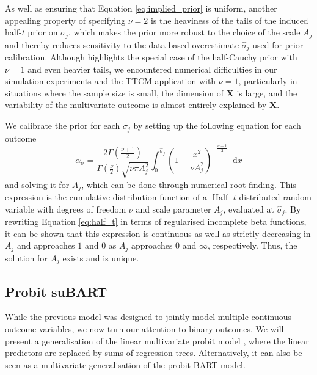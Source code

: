 \documentclass[aoas,preprint]{imsart}
\newcommand{\dd}{\mathop{}\!\mathrm{d}}
\theoremstyle{plain}
\theoremstyle{definition}
\theoremstyle{remark}
\begin{document}
As well as ensuring that Equation \eqref{eq:implied_prior} is uniform, another appealing property of specifying $\nu=2$ is the heaviness of the tails of the induced half-$t$ prior on $\sigma_j$, which makes the prior more robust to the choice of the scale $A_j$ and thereby reduces sensitivity to the data-based overestimate $\hat{\sigma}_j$ used for prior calibration. Although \citet{gelman2006prior} highlights the special case of the half-Cauchy prior with $\nu=1$ and even heavier tails, we encountered numerical difficulties in our simulation experiments and the TTCM application with $\nu=1$, particularly in situations where the sample size is small, the dimension of $\mathbf{X}$ is large, and the variability of the multivariate outcome is almost entirely explained by $\mathbf{X}$.

We calibrate the prior for each $\sigma_j$ by setting up the following equation for each outcome
\begin{equation}
\alpha_{\sigma} =   \frac{2\Gamma(\frac{\nu + 1}{2})}{\Gamma(\frac{\nu}{2})\sqrt{\nu \pi A^2_{j}}} \int_0^{\hat{\sigma}_{j}}
    {\left(1 + \frac{x^2}{\nu A^2_{j}}\right)}^{-\frac{\nu + 1}{2}}
    \dd x\label{eq:half_t}
\end{equation}
and solving it for $A_{j}$, which can be done through numerical root-finding. This expression is the cumulative distribution function of a $\operatorname{Half-}\!t$-distributed random variable with degrees of freedom $\nu$ and scale parameter $A_j$,
evaluated at $\hat{\sigma}_j$. By rewriting Equation \eqref{eq:half_t} in terms of regularised incomplete beta functions, it can be shown that this expression is continuous as well as strictly decreasing in $A_j$ and approaches $1$ and $0$ as $A_j$ approaches $0$ and $\infty$, respectively. Thus, the solution for $A_j$ exists and is unique. 

\subsection{Probit suBART}\label{sec:suBART_probit}

While the previous model was designed to jointly model multiple continuous outcome variables, we now turn our attention to binary outcomes. We will present a generalisation of the linear multivariate probit model \citep{chib1998analysis}, where the linear predictors are replaced by sums of regression trees. Alternatively, it can also be seen as a multivariate generalisation of the probit BART model.
\end{document}

